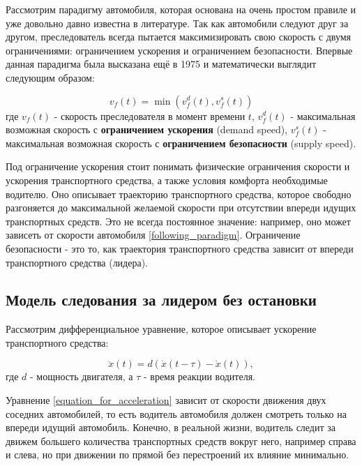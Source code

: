 \documentclass[12pt, a4paper]{extarticle}
\numberwithin{equation}{section}
\begin{document}
Рассмотрим парадигму автомобиля, которая основана на очень простом правиле и уже довольно давно известна в литературе. Так как автомобили следуют друг за другом, преследователь всегда пытается максимизировать свою скорость с двумя ограничениями: ограничением ускорения и ограничением безопасности. Впервые данная парадигма была высказана ещё в 1975 \cite{GippsModel} и математически выглядит следующим образом:

\begin{equation} \label{following_paradigm}
v_f(t) = \min(v_f^d(t), v_f^s(t))
\end{equation}
где $v_f(t)$ - скорость преследователя в момент времени $t$, $v_f^d(t)$ - максимальная возможная скорость с \textbf{ограничением ускорения} (demand speed), $v_f^s(t)$ - максимальная возможная скорость с \textbf{ограничением безопасности} (supply speed).

Под ограничение ускорения стоит понимать физические ограничения скорости и ускорения транспортного средства, а также условия комфорта необходимые водителю. Оно описывает траекторию транспортного средства, которое свободно разгоняется до максимальной желаемой скорости при отсутствии впереди идущих транспортных средств. Это не всегда постоянное значение: например, оно может зависеть от скорости автомобиля \eqref{following_paradigm}. Ограничение безопасности - это то, как траектория транспортного средства зависит от впереди транспортного средства (лидера).


\subsection{Модель следования за лидером без остановки}

Рассмотрим дифференциальное уравнение, которое описывает ускорение транспортного средства:

\begin{equation} \label{equation_for_acceleration}
\ddot{x}(t) = d (\dot{x}(t-\tau)-\dot{x}(t)),
\end{equation}
где $d$ - мощность двигателя, а $\tau$ - время реакции водителя.

Уравнение \eqref{equation_for_acceleration} зависит от скорости движения двух соседних автомобилей, то есть водитель автомобиля должен смотреть только на впереди идущий автомобиль. Конечно, в реальной жизни, водитель следит за движем большего количества транспортных средств вокруг него, например справа и слева, но при движении по прямой без перестроений их влияние минимально.
\end{document}
